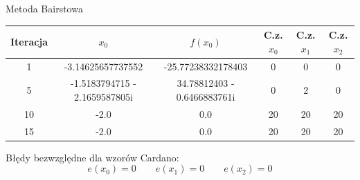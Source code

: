 \documentclass[a4paper]{article}
\begin{document}
    \vspace{5mm}

    \begin{center}
        Metoda Bairstowa
    \end{center}
    \begin{center}
        \begin{tabular}{|c|c|c|c|c|c|} 
            \hline
            Iteracja & $x_0$ & $f(x_0)$ & C.z. $x_0$ & C.z. $x_1$ & C.z. $x_2$ \\
            \hline
            1 & -3.14625657737552 & -25.77238332178403 & 0 & 0 & 0 \\ 
            \hline
            5 & -1.5183794715 - 2.1659587805i & 34.78812403 - 0.6466883761i & 0 & 2 & 0 \\ 
            \hline
            10 & -2.0 & 0.0 & 20 & 20 & 20 \\
            \hline
            15 & -2.0 & 0.0 & 20 & 20 & 20 \\
            \hline
        \end{tabular}
    \end{center}

    \vspace{5mm}

    \begin{center}
        Błędy bezwzględne dla wzorów Cardano:
        \[
            e(x_0) = 0 \qquad e(x_1) = 0 \qquad e(x_2) = 0  
        \]
    \end{center}
\end{document}
